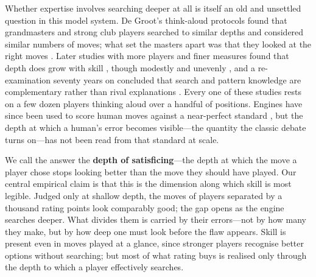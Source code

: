 Whether expertise involves searching deeper at all is itself an old and unsettled question in
this model system. De Groot's think-aloud protocols found that grandmasters and strong club
players searched to similar depths and considered similar numbers of moves; what set the
masters apart was that they looked at the right moves \citep{degroot1965}. Later studies with
more players and finer measures found that depth does grow with skill
\citep{charness1981,holding1985,campitelli2004}, though modestly and unevenly
\citep{gobet1998}, and a re-examination seventy years on concluded that search and pattern
knowledge are complementary rather than rival explanations \citep{connors2011}. Every one of
these studies rests on a few dozen players thinking aloud over a handful of positions. Engines
have since been used to score human moves against a near-perfect standard
\citep{guid2006,regan2011,anderson2016}, but the depth at which a human's error becomes
visible---the quantity the classic debate turns on---has not been read from that standard at
scale.

We call the answer the \textbf{depth of satisficing}---the depth at which the move a player
chose stops looking better than the move they should have played. Our central empirical claim
is that this is the dimension along which skill is most legible.
Judged only at shallow depth, the moves of players separated by a thousand rating points look
comparably good; the gap opens as the engine searches deeper. What divides them is carried by
their errors---not by how many they make, but by how deep one must look before the flaw
appears. Skill is present even in moves played at a glance, since stronger players recognise
better options without searching; but most of what rating buys is realised only through the
depth to which a player effectively searches.

